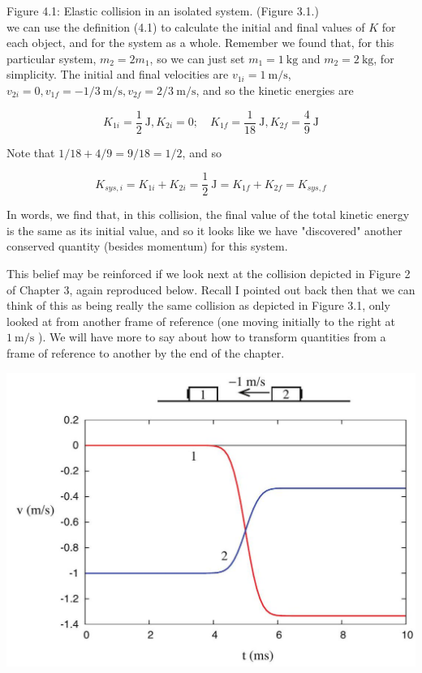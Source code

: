 \documentclass[10pt]{article}
\begin{document}
Figure 4.1: Elastic collision in an isolated system. (Figure 3.1.)\\
we can use the definition (4.1) to calculate the initial and final values of $K$ for each object, and for the system as a whole. Remember we found that, for this particular system, $m_{2}=2 m_{1}$, so we can just set $m_{1}=1 \mathrm{~kg}$ and $m_{2}=2 \mathrm{~kg}$, for simplicity. The initial and final velocities are $v_{1 i}=1 \mathrm{~m} / \mathrm{s}$,\\
$v_{2 i}=0, v_{1 f}=-1 / 3 \mathrm{~m} / \mathrm{s}, v_{2 f}=2 / 3 \mathrm{~m} / \mathrm{s}$, and so the kinetic energies are

$$
K_{1 i}=\frac{1}{2} \mathrm{~J}, K_{2 i}=0 ; \quad K_{1 f}=\frac{1}{18} \mathrm{~J}, K_{2 f}=\frac{4}{9} \mathrm{~J}
$$

Note that $1 / 18+4 / 9=9 / 18=1 / 2$, and so

$$
K_{s y s, i}=K_{1 i}+K_{2 i}=\frac{1}{2} \mathrm{~J}=K_{1 f}+K_{2 f}=K_{s y s, f}
$$

In words, we find that, in this collision, the final value of the total kinetic energy is the same as its initial value, and so it looks like we have "discovered" another conserved quantity (besides momentum) for this system.

This belief may be reinforced if we look next at the collision depicted in Figure 2 of Chapter 3, again reproduced below. Recall I pointed out back then that we can think of this as being really the same collision as depicted in Figure 3.1, only looked at from another frame of reference (one moving initially to the right at $1 \mathrm{~m} / \mathrm{s}$ ). We will have more to say about how to transform quantities from a frame of reference to another by the end of the chapter.

\begin{center}
\includegraphics[max width=\textwidth]{2024_09_14_9969b06773f10b6936e8g-089}
\end{center}
\end{document}
